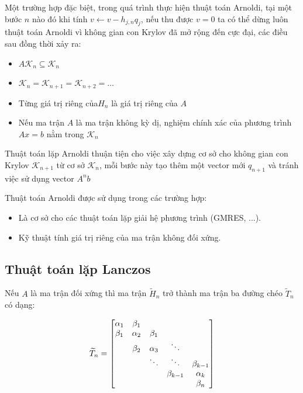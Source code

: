 \documentclass[14pt, a4paper]{article}
\numberwithin{equation}{section}
\numberwithin{algorithm}{section}
\numberwithin{figure}{section}
\numberwithin{dl}{section}
\numberwithin{md}{section}
\numberwithin{bd}{section}
\numberwithin{dn}{section}
\begin{document}
Một trường hợp đặc biệt, trong quá trình thực hiện thuật toán Arnoldi, tại một bước $n$ nào đó khi tính $v \leftarrow v - h_{j,n}q_j$, nếu thu được $v=0$ ta có thể dừng luôn thuật toán Arnoldi vì không gian con Krylov đã mở rộng đến cực đại, các điều sau đồng thời xảy ra:


\begin{itemize}
    \item $A\mathcal{K}_n \subseteq  \mathcal{K}_n$
    \item $\mathcal{K}_n=\mathcal{K}_{n+1}=\mathcal{K}_{n+2}=\dots$
    \item Từng giá trị riêng của$ H_n$ là giá trị riêng của $A$
    \item Nếu ma trận $A$ là ma trận không kỳ dị, nghiệm chính xác của phương trình $Ax=b$ nằm trong $\mathcal{K}_n$
\end{itemize}


Thuật toán lặp Arnoldi thuận tiện cho việc xây dựng cơ sở cho không gian con Krylov $\mathcal{K}_{n+1}$ từ cơ sở $\mathcal{K}_n$, mỗi bước này tạo thêm một vector mới $q_{n+1}$ và tránh việc sử dụng vector $A^n b$

Thuật toán Arnoldi được sử dụng trong các trường hợp:
\begin{itemize}
    \item Là cơ sở cho các thuật toán lặp giải hệ phương trình (GMRES, ...).
    \item Kỹ thuật tính giá trị riêng của ma trận không đối xứng.
\end{itemize}

\subsection{Thuật toán lặp Lanczos} \label{Lanczos-Algorithm}


Nếu $A$ là ma trận đối xứng thì ma trận $\widetilde{H}_n$ trở thành ma trận ba đường chéo $\widetilde{T}_n$ có dạng:

\begin{equation} \label{eq:Trigonal_Matrix}
    \widetilde{T}_n = \begin{bmatrix}
        \alpha_1 & \beta_1 & \space & \space & \space \\
        \beta_1 & \alpha_2 & \beta_1 & \space & \space \\
        \space & \beta_2 & \alpha_3 & \ddots & \space \\
        \space & \space & \ddots & \ddots & \beta_{k-1} \\
        \space & \space & \space & \beta_{k-1} & \alpha_k \\
        \space & \space & \space & \space & \beta_{n}
    \end{bmatrix}
\end{equation}
\end{document}
